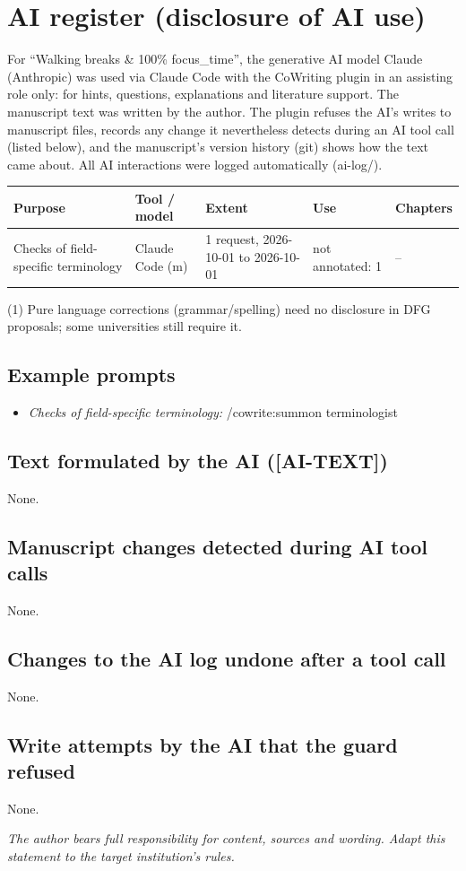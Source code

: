 \section*{AI register (disclosure of AI use)}

For “Walking breaks \& 100\% focus\_time”, the generative AI model Claude (Anthropic) was used via Claude Code with the CoWriting plugin in an assisting role only: for hints, questions, explanations and literature support. The manuscript text was written by the author. The plugin refuses the AI's writes to manuscript files, records any change it nevertheless detects during an AI tool call (listed below), and the manuscript's version history (git) shows how the text came about. All AI interactions were logged automatically (ai-log/).

\begin{tabular}{p{.22\linewidth}p{.18\linewidth}p{.2\linewidth}p{.2\linewidth}p{.1\linewidth}}
\hline
\textbf{Purpose} & \textbf{Tool / model} & \textbf{Extent} & \textbf{Use} & \textbf{Chapters} \\
\hline
Checks of field-specific terminology & Claude Code (m) & 1 request, 2026-10-01 to 2026-10-01 & not annotated: 1 & – \\
\hline
\end{tabular}

\noindent(1) Pure language corrections (grammar/spelling) need no disclosure in DFG proposals; some universities still require it.

\subsection*{Example prompts}
\begin{itemize}
  \item \textit{Checks of field-specific terminology:} /cowrite:summon terminologist
\end{itemize}
\subsection*{Text formulated by the AI ([AI-TEXT])}
None.
\subsection*{Manuscript changes detected during AI tool calls}
None.
\subsection*{Changes to the AI log undone after a tool call}
None.
\subsection*{Write attempts by the AI that the guard refused}
None.

\textit{The author bears full responsibility for content, sources and wording. Adapt this statement to the target institution's rules.}
